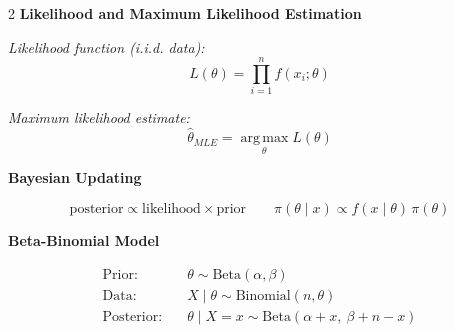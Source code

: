 \documentclass[8pt]{article}
\begin{document}
\begin{multicols}{2}
\textbf{Likelihood and Maximum Likelihood Estimation}

\textit{Likelihood function (i.i.d. data):}
\[ L(\theta) = \prod_{i=1}^n f(x_i; \theta) \]

\textit{Maximum likelihood estimate:}
\[ \hat{\theta}_{MLE} = \operatorname*{arg\,max}_\theta L(\theta) \]

\textbf{Bayesian Updating}

\[ \text{posterior} \propto \text{likelihood} \times \text{prior} \qquad \pi(\theta \mid x) \propto f(x \mid \theta)\,\pi(\theta) \]

\textbf{Beta-Binomial Model}

\begin{align*}
    \text{Prior:} \quad & \theta \sim \text{Beta}(\alpha, \beta) \\
    \text{Data:} \quad & X \mid \theta \sim \text{Binomial}(n, \theta) \\
    \text{Posterior:} \quad & \theta \mid X = x \sim \text{Beta}(\alpha + x,\ \beta + n - x)
\end{align*}

\end{multicols} %
\end{document}
